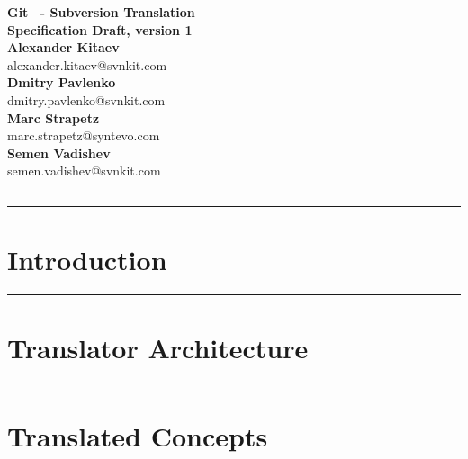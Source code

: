 \documentclass[aps,%
12pt,%
final,%
oneside,
onecolumn,%
superscriptaddress,%
centertags]{article} %
\begin{document}
\begin{titlepage}
\begin{center}

\textbf{\LARGE Git –- Subversion Translation} \\[2.0cm]
\textbf{\Large Specification Draft, version 1}\\[3.0cm]

\textbf{Alexander Kitaev} \\[0.2cm]
\textnormal{alexander.kitaev@svnkit.com} \\[1.0cm]

\textbf{Dmitry Pavlenko} \\[0.2cm]
\textnormal{dmitry.pavlenko@svnkit.com} \\[1.0cm]

\textbf{Marc Strapetz} \\[0.2cm]
\textnormal{marc.strapetz@syntevo.com} \\[1.0cm]

\textbf{Semen Vadishev} \\[0.2cm]
\textnormal{semen.vadishev@svnkit.com} \\[1.0cm]

\end{center}
\end{titlepage}

\topmargin=-10pt
\setcounter{page}{2}

\newpage
\hrule
\tableofcontents

\newpage
\hrule
\section{Introduction}


\newpage
\hrule
\section{Translator Architecture}






\newpage
\hrule
\section{Translated Concepts}






\end{document}
